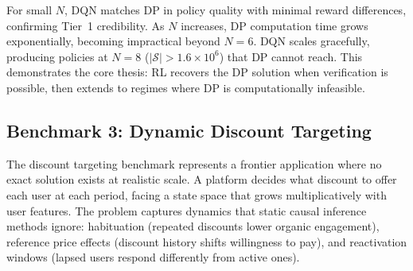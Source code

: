 For small $N$, DQN matches DP in policy quality with minimal reward differences, confirming Tier~1 credibility. As $N$ increases, DP computation time grows exponentially, becoming impractical beyond $N = 6$. DQN scales gracefully, producing policies at $N = 8$ ($|\mathcal{S}| > 1.6 \times 10^6$) that DP cannot reach. This demonstrates the core thesis: RL recovers the DP solution when verification is possible, then extends to regimes where DP is computationally infeasible.


\subsection{Benchmark 3: Dynamic Discount Targeting}
\label{sec:benchmark_discount}

The discount targeting benchmark represents a frontier application where no exact solution exists at realistic scale. A platform decides what discount to offer each user at each period, facing a state space that grows multiplicatively with user features. The problem captures dynamics that static causal inference methods ignore: habituation (repeated discounts lower organic engagement), reference price effects (discount history shifts willingness to pay), and reactivation windows (lapsed users respond differently from active ones).

